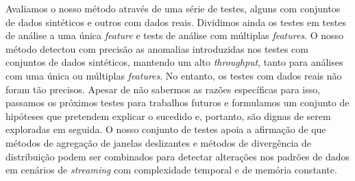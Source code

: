 Avaliamos o nosso método através de uma série de testes, alguns com conjuntos de dados sintéticos e outros com dados reais. Dividimos ainda os testes em testes de análise a uma única \textit{feature} e tests de análise com múltiplas \textit{features}. O nosso método detectou com precisão as anomalias introduzidas nos testes com conjuntos de dados sintéticos, mantendo um alto \textit{throughput}, tanto para análises com uma única ou múltiplas \textit{features}. No entanto, os testes com dados reais não foram tão precisos. Apesar de não sabermos as razões específicas para isso, passamos os próximos testes para trabalhos futuros e formulamos um conjunto de hipóteses que pretendem explicar o sucedido e, portanto, são dignas de serem exploradas em seguida. O nosso conjunto de testes apoia a afirmação de que métodos de agregação de janelas deslizantes e métodos de divergência de distribuição podem ser combinados para detectar alterações nos padrões de dados em cenários de \textit{streaming} com complexidade temporal e de memória constante.
